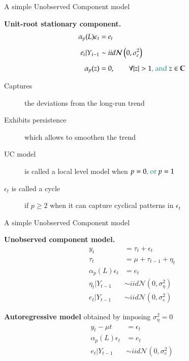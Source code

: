 \documentclass[notes,blackandwhite,mathsans,usenames,dvipsnames]{beamer}
\begin{document}
\begin{frame}{A simple Unobserved Component model}

\textbf{Unit-root stationary component.}
\begin{align*}
\alpha_p(L)\epsilon_t &=  e_t\\[1ex]
e_t |Y_{t-1} &\sim iid\mathcal{N}\left(0,\sigma_e^2\right)\\[1ex]
\alpha_p(z)&=0,\qquad \forall |z|>1\text{{\color{mcxs2}, and} }z\in\mathbb{C}
\end{align*}

\begin{description}
\item[Captures] {\color{mcxs2}the deviations from the long-run trend}
\item[Exhibits persistence] {\color{mcxs2}which allows to smoothen the trend }
\item[UC model] {\color{mcxs2}is called a} {\color{purple}local level model} {\color{mcxs2}when} $p=0\text{\color{mcxs2}, or }p=1$
\item[$\epsilon_t$ is called a cycle] {\color{mcxs2}if } $p\geq2$ {\color{mcxs2}when it can capture cyclical patterns in} $\epsilon_t$
\end{description}
\end{frame}






\begin{frame}{A simple Unobserved Component model}

\bigskip
\textbf{Unobserved component model.}
$$
\begin{array}{rl}
y_t &= \tau_t + \epsilon_t\\[1ex]
\tau_t &= \mu + \tau_{t-1} + \eta_t\\[1ex]
\alpha_p(L)\epsilon_t &=  e_t\\[1ex]
\eta_t|Y_{t-1} &\sim iid\mathcal{N}\left(0,\sigma_\eta^2\right)\\[1ex]
e_t |Y_{t-1} &\sim iid\mathcal{N}\left(0,\sigma_e^2\right)
\end{array}
$$

\bigskip\textbf{Autoregressive model} obtained by imposing $\sigma_\eta^2=0$
$$
\begin{array}{rl}
y_t -\mu t &= \epsilon_t\\[1ex]
\alpha_p(L)\epsilon_t &=  e_t\\[1ex]
e_t |Y_{t-1} &\sim iid\mathcal{N}\left(0,\sigma_e^2\right)
\end{array}
$$


\end{frame}
\end{document}
